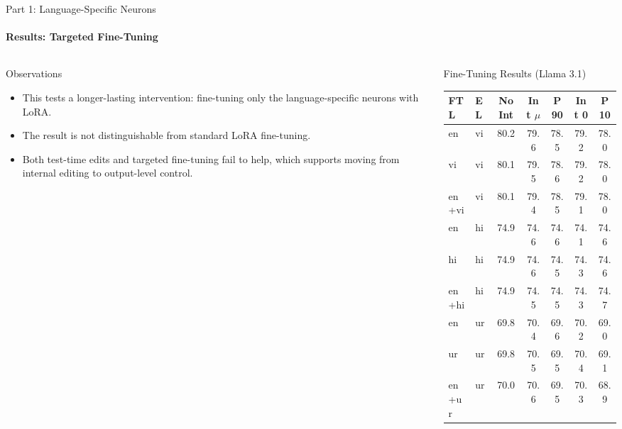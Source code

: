 \documentclass[aspectratio=169]{beamer}
\begin{document}
	\begin{frame}{Part 1: Language-Specific Neurons}
		\framesubtitle{Results: Targeted Fine-Tuning}
		\begin{columns}
			\begin{column}{0.45\textwidth}
				\begin{block}{\scriptsize Observations}\scriptsize
					\begin{itemize}
						\item This tests a longer-lasting intervention: fine-tuning only the language-specific neurons with LoRA.
						\item The result is not distinguishable from standard LoRA fine-tuning.
						\item Both test-time edits and targeted fine-tuning fail to help, which supports moving from internal editing to output-level control.
					\end{itemize}
				\end{block}
			\end{column}
			\begin{column}{0.45\textwidth}
				\begin{block}{\scriptsize Fine-Tuning Results (Llama 3.1)}\tiny
					\centering
					\setlength{\tabcolsep}{4pt}
					\begin{tabular}{l l c c c c c}
						\toprule
						FTL & EL & No Int & Int $\mu$ & P90 & Int 0 & P10 \\
						\midrule
						en & vi & 80.2 & 79.6 & 78.5 & 79.2 & 78.0 \\
						vi & vi & 80.1 & 79.5 & 78.6 & 79.2 & 78.0 \\
						en+vi & vi & 80.1 & 79.4 & 78.5 & 79.1 & 78.0 \\
						\midrule
						en & hi & 74.9 & 74.6 & 74.6 & 74.1 & 74.6 \\
						hi & hi & 74.9 & 74.6 & 74.5 & 74.3 & 74.6 \\
						en+hi & hi & 74.9 & 74.5 & 74.5 & 74.3 & 74.7 \\
						\midrule
						en & ur & 69.8 & 70.4 & 69.6 & 70.2 & 69.0 \\
						ur & ur & 69.8 & 70.5 & 69.5 & 70.4 & 69.1 \\
						en+ur & ur & 70.0 & 70.6 & 69.5 & 70.3 & 68.9 \\
						\bottomrule
					\end{tabular}
				\end{block}
			\end{column}
		\end{columns}
	\end{frame}
	
\end{document}
